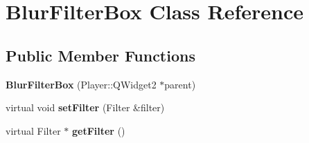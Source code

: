 \hypertarget{classBlurFilterBox}{}\section{Blur\+Filter\+Box Class Reference}
\label{classBlurFilterBox}
\subsection*{Public Member Functions}
\begin{DoxyCompactItemize}
\item 
\hypertarget{classBlurFilterBox_a9a8048264a4b5ed5779ca3a4bb025410}{}{\bfseries Blur\+Filter\+Box} (Player\+::\+Q\+Widget2 $\ast$parent)\label{classBlurFilterBox_a9a8048264a4b5ed5779ca3a4bb025410}

\item 
\hypertarget{classBlurFilterBox_a09e99b0db09b8468ce7d7e0f98293ac5}{}virtual void {\bfseries set\+Filter} (Filter \&filter)\label{classBlurFilterBox_a09e99b0db09b8468ce7d7e0f98293ac5}

\item 
\hypertarget{classBlurFilterBox_ad7b14770615490d1445c958c79fd3adb}{}virtual Filter $\ast$ {\bfseries get\+Filter} ()\label{classBlurFilterBox_ad7b14770615490d1445c958c79fd3adb}

\end{DoxyCompactItemize}
